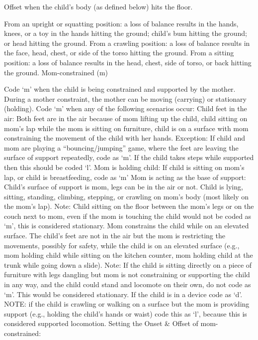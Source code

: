 \documentclass[
]{book}
\begin{document}
Offset when the child's body (as defined below) hits the floor.

From an upright or squatting position: a loss of balance results in the hands, knees, or a toy in the hands hitting the ground; child's bum hitting the ground; or head hitting the ground.
From a crawling position: a loss of balance results in the face, head, chest, or side of the torso hitting the ground.
From a sitting position: a loss of balance results in the head, chest, side of torso, or back hitting the ground.
Mom-constrained (m)

Code `m' when the child is being constrained and supported by the mother. During a mother constraint, the mother can be moving (carrying) or stationary (holding). Code `m' when any of the following scenarios occur:
Child feet in the air: Both feet are in the air because of mom lifting up the child, child sitting on mom's lap while the mom is sitting on furniture, child is on a surface with mom constraining the movement of the child with her hands. Exception: If child and mom are playing a ``bouncing/jumping'' game, where the feet are leaving the surface of support repeatedly, code as `m'. If the child takes steps while supported then this should be coded `l'.
Mom is holding child: If child is sitting on mom's lap, or child is breastfeeding, code as `m'
Mom is acting as the base of support: Child's surface of support is mom, legs can be in the air or not. Child is lying, sitting, standing, climbing, stepping, or crawling on mom's body (most likely on the mom's lap).
Note: Child sitting on the floor between the mom's legs or on the couch next to mom, even if the mom is touching the child would not be coded as `m', this is considered stationary.
Mom constrains the child while on an elevated surface. The child's feet are not in the air but the mom is restricting the movements, possibly for safety, while the child is on an elevated surface (e.g., mom holding child while sitting on the kitchen counter, mom holding child at the trunk while going down a slide). Note: If the child is sitting directly on a piece of furniture with legs dangling but mom is not constraining or supporting the child in any way, and the child could stand and locomote on their own, do not code as `m'. This would be considered stationary. If the child is in a device code as `d'.
NOTE: if the child is crawling or walking on a surface but the mom is providing support (e.g., holding the child's hands or waist) code this as `l', because this is considered supported locomotion.
Setting the Onset \& Offset of mom-constrained:
\end{document}
